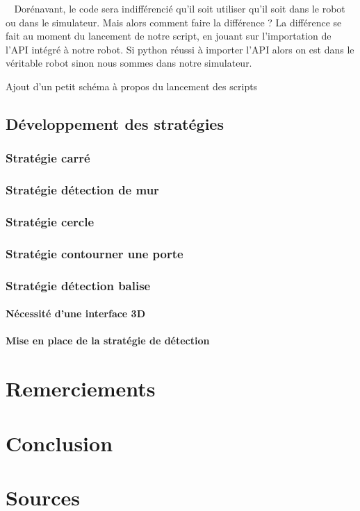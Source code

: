 \documentclass[12pt]{article}
\def\tab{$\>\>\>\>$}
\begin{document}
\tab Dorénavant, le code sera indifférencié qu'il soit utiliser qu'il soit dans le robot ou dans le simulateur. Mais alors comment faire la différence ? La différence se fait au moment du lancement de notre script, en jouant sur l'importation de l'API intégré à notre robot. Si python réussi à importer l'API alors on est dans le véritable robot sinon nous sommes dans notre simulateur.

\begin{center}
Ajout d'un petit schéma à propos du lancement des scripts
\end{center}

\newpage
\subsection{Développement des stratégies}
\subsubsection{Stratégie carré}
\subsubsection{Stratégie détection de mur}
\subsubsection{Stratégie cercle}
\subsubsection{Stratégie contourner une porte}
\subsubsection{Stratégie détection balise}
\paragraph{Nécessité d'une interface 3D \\}
\paragraph{Mise en place de la stratégie de détection\\}

\newpage

\section{Remerciements}

\newpage

\section{Conclusion}

\newpage

\section{Sources}
\end{document}

